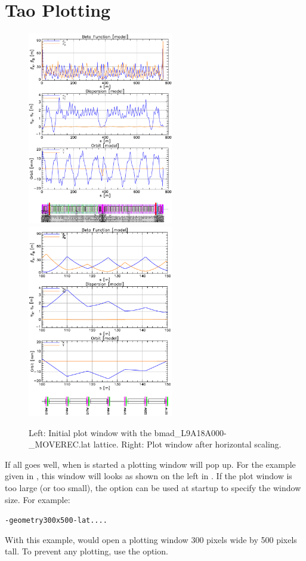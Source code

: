 \documentclass{hitec}
\newenvironment{display}
  {\vspace*{-1.5ex} \begin{alltt}}
  {\end{alltt} \vspace*{-1.0ex}}
\begin{document}
\section{Tao Plotting}

\begin{figure}[t]
\begin{centering}
\includegraphics[width=2.5in]{tao-start.pdf}
\hfil
\includegraphics[width=2.5in]{tao-x-scale.pdf}
\caption{Left: Initial \tao plot window with the bmad_L9A18A000-_MOVEREC.lat lattice.
Right: Plot window after horizontal scaling.}
\label{f:tao-start}
\end{centering}
\end{figure}

If all goes well, when \tao is started a plotting window will pop up. For the example given
in , this window will looks as shown on the left in
. If the plot window is too large (or too small), the  option
can be used at startup to specify the window size. For example:
\begin{display}
  \tao -geometry 300x500 -lat ....
\end{display}
With this example, \tao would open a plotting window 300 pixels wide by 500 pixels tall.
To prevent any plotting, use the  option.
\end{document}
